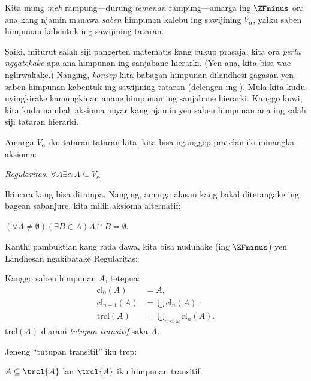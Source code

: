 \documentclass[../../../include/open-logic-section]{subfiles}
\begin{document}


Kita mung \emph{meh} rampung---durung \emph{temenan}
rampung---amarga ing $\ZFminus$ ora ana kang
njamin manawa \emph{saben} himpunan kalebu ing
sawijining $V_\alpha$, yaiku saben himpunan
kabentuk ing sawijining tataran.

Saiki, miturut salah siji pangerten matematis kang
cukup prasaja, kita ora \emph{perlu nggatekake}
apa ana himpunan ing sanjabane hierarki. (Yen ana,
kita bisa wae nglirwakake.) Nanging, \emph{konsep}
kita babagan himpunan dilandhesi gagasan yen saben
himpunan kabentuk ing sawijining tataran
(delengen \stageshier{} ing ).
Mula kita kudu nyingkirake kamungkinan anane
himpunan ing sanjabane hierarki. Kanggo kuwi,
kita kudu nambah aksioma anyar kang njamin yen
saben himpunan ana ing salah siji tataran hierarki.

Amarga $V_\alpha$ iku tataran-tataran kita,
kita bisa nganggep pratelan iki minangka aksioma:

\begin{defish}
\emph{Regularitas.} $\forall A \exists \alpha\, A \subseteq V_\alpha$
\end{defish}

Iki cara kang bisa ditampa. Nanging,
amarga alasan kang bakal diterangake ing bagean
sabanjure, kita milih aksioma alternatif:

\begin{axiom}[Landhesan]
$(\forall A \neq \emptyset)(\exists B \in A)A \cap B = \emptyset$.
\end{axiom}

Kanthi pambuktian kang rada dawa, kita bisa
nuduhake (ing $\ZFminus$) yen Landhesan
ngakibatake Regularitas:
\begin{defn}
Kanggo saben himpunan $A$, tetepna:
\begin{align*}
	\text{cl}_0(A) &= A,\\
	\text{cl}_{n+1}(A) &= \bigcup \text{cl}_n(A),\\
	\text{trcl}(A) &= \bigcup_{n < \omega} \text{cl}_{n}(A).
\end{align*}
$\text{trcl}(A)$ diarani \emph{tutupan
transitif} saka $A$.
\end{defn}
\noindent
Jeneng ``tutupan transitif'' iku trep:
\begin{prop}
$A \subseteq \trcl{A}$ lan $\trcl{A}$ iku himpunan transitif. 
\end{prop}
\end{document}
